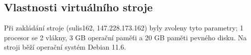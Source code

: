 \subsection{Vlastnosti virtuálního stroje}
Při zakládání stroje (sulis162, 147.228.173.162) byly zvoleny tyto parametry; 1 procesor se 2 vlákny, 3 GB operační paměťi a 20 GB paměti pevného disku. Na stroji běží operační systém Debian 11.6.